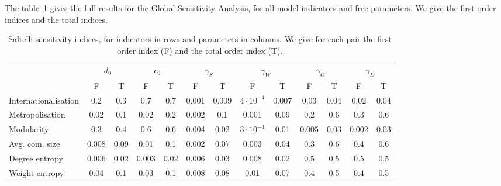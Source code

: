 The table~\ref{tab:saltelli} gives the full results for the Global Sensitivity Analysis, for all model indicators and free parameters. We give the first order indices and the total indices.

\begin{table}[h!]
\begin{adjustwidth}{-2.25in}{0in}
\caption{Saltelli sensitivity indices, for indicators in rows and parameters in columns. We give for each pair the first order index (F) and the total order index (T).\label{tab:saltelli}}
\hspace{-1cm}\begin{tabular}{|l|c|c|c|c|c|c|c|c|c|c|c|c|}
\hline
 & \multicolumn{2}{|c|}{$d_0$} & \multicolumn{2}{|c|}{$c_0$} & \multicolumn{2}{|c|}{$\gamma_S$} & \multicolumn{2}{|c|}{$\gamma_W$} & \multicolumn{2}{|c|}{$\gamma_O$} & \multicolumn{2}{|c|}{$\gamma_D$} \\
 & F & T & F & T & F & T & F & T & F & T & F & T \\
 \hline
Internationalisation & 0.2 & 0.3 & 0.7 & 0.7 & 0.001 & 0.009 & $4\cdot 10^{-4}$ & 0.007 & 0.03 & 0.04 & 0.02 & 0.04 \\
Metropolisation & 0.02 & 0.1 & 0.02 & 0.2 & 0.002 & 0.1 & 0.001 & 0.09 & 0.2 & 0.6 & 0.3 & 0.6 \\
Modularity & 0.3 & 0.4 & 0.6 & 0.6 & 0.004 & 0.02 & $3\cdot 10^{-4}$ & 0.01 & 0.005 & 0.03 & 0.002 & 0.03 \\
Avg. com. size & 0.008 & 0.09 & 0.01 & 0.1 & 0.002 & 0.07 & 0.003 & 0.04 & 0.3 & 0.6 & 0.4 & 0.6 \\
Degree entropy & 0.006 & 0.02 & 0.003 & 0.02 & 0.006 & 0.03 & 0.008 & 0.02 & 0.5 & 0.5 & 0.5 & 0.5 \\
Weight entropy & 0.04 & 0.1 & 0.03 & 0.1 & 0.008 & 0.08 & 0.01 & 0.07 & 0.4 & 0.5 & 0.4 & 0.5 \\\hline
\end{tabular}
\end{adjustwidth}
\end{table}





